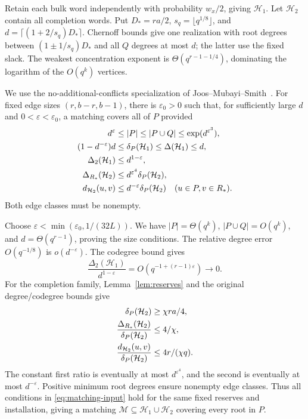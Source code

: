 \documentclass[12pt,letterpaper,onecolumn]{article}
\theoremstyle{definition}
\newcommand{\cH}{\mathcal H}
\newcommand{\cM}{\mathcal M}
\begin{document}
Retain each bulk word independently with probability $w_x/2$, giving $\cH_1$. Let $\cH_2$ contain all completion words. Put $D_*=ra/2$, $s_q=\lfloor q^{1/8}\rfloor$, and $d=\lceil(1+2/s_q)D_*\rceil$. Chernoff bounds give one realization with root degrees between $(1\pm1/s_q)D_*$ and all $Q$ degrees at most $d$; the latter use the fixed slack. The weakest concentration exponent is $\Theta(q^{r-1-1/4})$, dominating the logarithm of the $O(q^k)$ vertices.

We use the no-additional-conflicts specialization of Joos--Mubayi--Smith~\cite[Theorem 3.1]{jms2026}. For fixed edge sizes $(r,b-r,b-1)$, there is $\varepsilon_0>0$ such that, for sufficiently large $d$ and $0<\varepsilon<\varepsilon_0$, a matching covers all of $P$ provided
\begin{align}
 d^\varepsilon&\le|P|\le|P\cup Q|\le\exp(d^{\varepsilon^3}),\notag\\
 (1-d^{-\varepsilon})d&\le\delta_P(\cH_1)\le\Delta(\cH_1)\le d,\notag\\
 \Delta_2(\cH_1)&\le d^{1-\varepsilon},\notag\\
 \Delta_{R_*}(\cH_2)&\le d^{\varepsilon^4}\delta_P(\cH_2),\notag\\
 d_{\cH_2}(u,v)&\le d^{-\varepsilon}\delta_P(\cH_2)
 \quad(u\in P,v\in R_*).
 \label{eq:matching-input}
\end{align}
Both edge classes must be nonempty.

Choose $\varepsilon<\min(\varepsilon_0,1/(32L))$. We have $|P|=\Theta(q^k)$, $|P\cup Q|=O(q^k)$, and $d=\Theta(q^{r-1})$, proving the size conditions. The relative degree error $O(q^{-1/8})$ is $o(d^{-\varepsilon})$. The codegree bound gives
\[
 \frac{\Delta_2(\cH_1)}{d^{1-\varepsilon}}
 =O(q^{-1+(r-1)\varepsilon})\longrightarrow0.
\]
For the completion family, Lemma~\ref{lem:reserves} and the original degree/codegree bounds give
\begin{align}
 \delta_P(\cH_2)&\ge\chi ra/4,\notag\\
 \frac{\Delta_{R_*}(\cH_2)}{\delta_P(\cH_2)}&\le4/\chi,\notag\\
 \frac{d_{\cH_2}(u,v)}{\delta_P(\cH_2)}&\le4r/(\chi q).\notag
\end{align}
The constant first ratio is eventually at most $d^{\varepsilon^4}$, and the second is eventually at most $d^{-\varepsilon}$. Positive minimum root degrees ensure nonempty edge classes. Thus all conditions in \eqref{eq:matching-input} hold for the same fixed reserves and installation, giving a matching $\cM\subseteq\cH_1\cup\cH_2$ covering every root in $P$.
\end{document}
